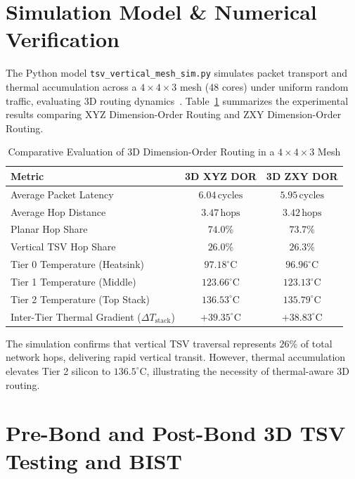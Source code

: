 \section{Simulation Model \& Numerical Verification}
\label{sec:3d-sim-verification}

The Python model \texttt{tsv\_vertical\_mesh\_sim.py} simulates packet transport and thermal accumulation across a $4 \times 4 \times 3$ mesh (48 cores) under uniform random traffic, evaluating 3D routing dynamics~\cite{Pavlidis2009,More2018}. Table~\ref{tab:3d-noc-results} summarizes the experimental results comparing XYZ Dimension-Order Routing and ZXY Dimension-Order Routing.

\begin{table}[htbp]
\centering
\caption{Comparative Evaluation of 3D Dimension-Order Routing in a $4 \times 4 \times 3$ Mesh}
\label{tab:3d-noc-results}
\begin{tabular}{lcc}
\hline
\textbf{Metric} & \textbf{3D XYZ DOR} & \textbf{3D ZXY DOR} \\
\hline
Average Packet Latency & $6.04\,\mathrm{cycles}$ & $5.95\,\mathrm{cycles}$ \\
Average Hop Distance & $3.47\,\mathrm{hops}$ & $3.42\,\mathrm{hops}$ \\
Planar Hop Share & $74.0\%$ & $73.7\%$ \\
Vertical TSV Hop Share & $26.0\%$ & $26.3\%$ \\
Tier 0 Temperature (Heatsink) & $97.18^\circ\mathrm{C}$ & $96.96^\circ\mathrm{C}$ \\
Tier 1 Temperature (Middle) & $123.66^\circ\mathrm{C}$ & $123.13^\circ\mathrm{C}$ \\
Tier 2 Temperature (Top Stack) & $\mathbf{136.53^\circ\mathrm{C}}$ & $\mathbf{135.79^\circ\mathrm{C}}$ \\
Inter-Tier Thermal Gradient ($\Delta T_{\mathrm{stack}}$) & $+39.35^\circ\mathrm{C}$ & $+38.83^\circ\mathrm{C}$ \\
\hline
\end{tabular}
\end{table}

The simulation confirms that vertical TSV traversal represents $26\%$ of total network hops, delivering rapid vertical transit. However, thermal accumulation elevates Tier 2 silicon to $136.5^\circ\mathrm{C}$, illustrating the necessity of thermal-aware 3D routing.

\section{Pre-Bond and Post-Bond 3D TSV Testing and BIST}
\label{sec:ch8_testing}

